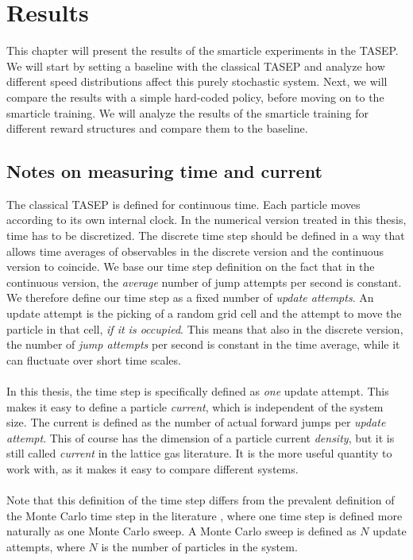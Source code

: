 \graphicspath{{img/results}{img/results/out}}

\chapter{Results}
\label{ch:results}
This chapter will present the results of the smarticle experiments in the TASEP. We will start by setting a baseline with the classical TASEP and analyze how different speed distributions affect this purely stochastic system. Next, we will compare the results with a simple hard-coded policy, before moving on to the smarticle training. We will analyze the results of the smarticle training for different reward structures and compare them to the baseline. 

\section{Notes on measuring time and current}
\label{sec:time_current}
The classical TASEP is defined for continuous time. Each particle moves according to its own internal clock. In the numerical version treated in this thesis, time has to be discretized. The discrete time step should be defined in a way that allows time averages of observables in the discrete version and the continuous version to coincide. We base our time step definition on the fact that in the continuous version, the \textit{average} number of jump attempts per second is constant. We therefore define our time step as a fixed number of \textit{update attempts}. An update attempt is the picking of a random grid cell and the attempt to move the particle in that cell, \textit{if it is occupied}. This means that also in the discrete version, the number of \textit{jump attempts} per second is constant in the time average, while it can fluctuate over short time scales.
\\
\\
In this thesis, the time step is specifically defined as \textit{one} update attempt. This makes it easy to define a particle \textit{current}, which is independent of the system size. The current is defined as the number of actual forward jumps per \textit{update attempt}. This of course has the dimension of a particle current \textit{density}, but it is still called \textit{current} in the lattice gas literature. It is the more useful quantity to work with, as it makes it easy to compare different systems. 
\\
\\
Note that this definition of the time step differs from the prevalent definition of the Monte Carlo time step in the literature \cite[ch. 3.2]{daquila_monte_nodate}, where one time step is defined more naturally as one Monte Carlo sweep. A Monte Carlo sweep is defined as $N$ update attempts, where $N$ is the number of particles in the system. 

